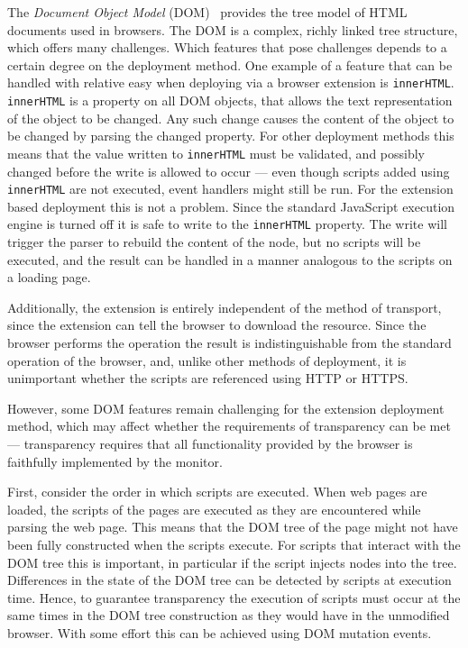 \documentclass{llncs}
\begin{document}
The \emph{Document Object Model} (DOM)~\cite{DOM2} provides the tree model of HTML
documents used in browsers. The DOM is a complex, richly linked tree structure,
which offers many challenges. Which features that pose challenges depends to a certain degree
on the deployment method. One example of a feature that can be handled with 
relative easy when deploying via a browser extension is 
\lstinline{innerHTML}. \lstinline{innerHTML} is a property on all DOM objects,
that allows the text representation of the object to be changed. Any such
change causes the content of the object to be changed by parsing the changed
property. For other deployment methods this means that the value written to
\lstinline{innerHTML} must be validated, and possibly changed before the write
is allowed to occur --- even though scripts added using \lstinline{innerHTML}
are not executed, event handlers might still be run.
%
For the extension based deployment this is not a problem.  Since the standard
JavaScript execution engine is turned off it is safe to write to the
\lstinline{innerHTML} property. The write will trigger the parser to rebuild
the content of the node, but no scripts will be executed, and the result can be
handled in a manner analogous to the scripts on a loading page.

Additionally, the extension is entirely independent of the method of transport,
since the extension can tell the browser to download the resource. Since the 
browser performs the operation the result
is indistinguishable from the standard operation of the browser, and, unlike other 
methods of deployment, it is unimportant whether the scripts
are referenced using HTTP or HTTPS.

However, some DOM features remain challenging for the extension deployment
method, which may affect whether the requirements of transparency can be met
--- transparency requires that all functionality provided by the browser is
faithfully implemented by the monitor.

First, consider the order in which scripts are executed.  When web pages are
loaded, the scripts of the pages are executed as they are encountered while
parsing the web page. This means that the DOM tree of the page might not have
been fully constructed when the scripts execute.  For scripts that interact
with the DOM tree this is important, in particular if the script injects nodes
into the tree. Differences in the state of the DOM tree can be detected by 
scripts at execution time. Hence, to guarantee transparency 
the execution of scripts must occur at the same times in the DOM tree construction
as they would have in the unmodified browser. With some effort this can be achieved
using DOM mutation events.
\end{document}
